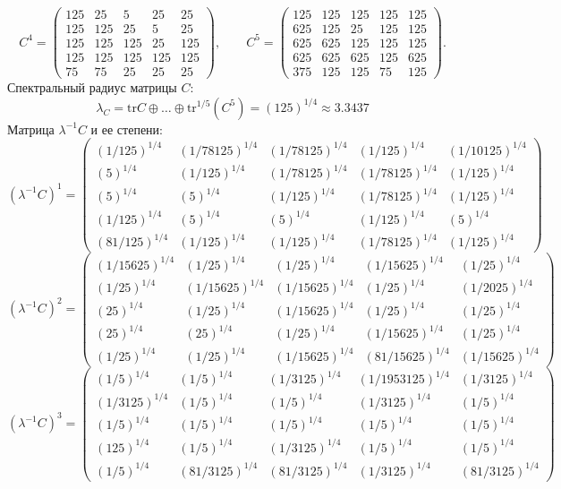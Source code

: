$$C^4 = \begin{pmatrix}
125 & 25 & 5 & 25 & 25\\
125 & 125 & 25 & 5 & 25\\
125 & 125 & 125 & 25 & 125\\
125 & 125 & 125 & 125 & 125\\
75 & 75 & 25 & 25 & 25
\end{pmatrix},
\qquad
C^5 = \begin{pmatrix}
125 & 125 & 125 & 125 & 125\\
625 & 125 & 25 & 125 & 125\\
625 & 625 & 125 & 125 & 125\\
625 & 625 & 625 & 125 & 625\\
375 & 125 & 125 & 75 & 125
\end{pmatrix}.
$$
Спектральный радиус матрицы $C$:
$$\lambda_{C} = \mathrm{tr}C\oplus \dots \oplus \mathrm{tr}^{1/5}(C^{5}) = (125)^{1/4} \approx 3.3437$$
Матрица $\lambda^{-1}C$ и ее степени:
$$(\lambda^{-1}C)^1 = \begin{pmatrix}
(1/125)^{1/4} & (1/78125)^{1/4} & (1/78125)^{1/4} & (1/125)^{1/4} & (1/10125)^{1/4}\\
(5)^{1/4} & (1/125)^{1/4} & (1/78125)^{1/4} & (1/78125)^{1/4} & (1/125)^{1/4}\\
(5)^{1/4} & (5)^{1/4} & (1/125)^{1/4} & (1/78125)^{1/4} & (1/125)^{1/4}\\
(1/125)^{1/4} & (5)^{1/4} & (5)^{1/4} & (1/125)^{1/4} & (5)^{1/4}\\
(81/125)^{1/4} & (1/125)^{1/4} & (1/125)^{1/4} & (1/78125)^{1/4} & (1/125)^{1/4}
\end{pmatrix}
$$
$$(\lambda^{-1}C)^2 = \begin{pmatrix}
(1/15625)^{1/4} & (1/25)^{1/4} & (1/25)^{1/4} & (1/15625)^{1/4} & (1/25)^{1/4}\\
(1/25)^{1/4} & (1/15625)^{1/4} & (1/15625)^{1/4} & (1/25)^{1/4} & (1/2025)^{1/4}\\
(25)^{1/4} & (1/25)^{1/4} & (1/15625)^{1/4} & (1/25)^{1/4} & (1/25)^{1/4}\\
(25)^{1/4} & (25)^{1/4} & (1/25)^{1/4} & (1/15625)^{1/4} & (1/25)^{1/4}\\
(1/25)^{1/4} & (1/25)^{1/4} & (1/15625)^{1/4} & (81/15625)^{1/4} & (1/15625)^{1/4}
\end{pmatrix}
$$
$$(\lambda^{-1}C)^3 = \begin{pmatrix}
(1/5)^{1/4} & (1/5)^{1/4} & (1/3125)^{1/4} & (1/1953125)^{1/4} & (1/3125)^{1/4}\\
(1/3125)^{1/4} & (1/5)^{1/4} & (1/5)^{1/4} & (1/3125)^{1/4} & (1/5)^{1/4}\\
(1/5)^{1/4} & (1/5)^{1/4} & (1/5)^{1/4} & (1/5)^{1/4} & (1/5)^{1/4}\\
(125)^{1/4} & (1/5)^{1/4} & (1/3125)^{1/4} & (1/5)^{1/4} & (1/5)^{1/4}\\
(1/5)^{1/4} & (81/3125)^{1/4} & (81/3125)^{1/4} & (1/3125)^{1/4} & (81/3125)^{1/4}
\end{pmatrix}
$$
